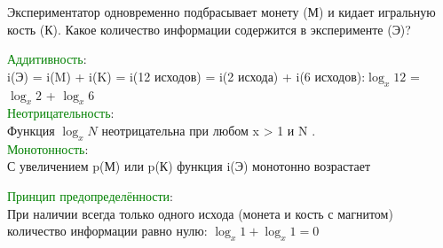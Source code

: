 \newpage
\rhead{\textbf{\textcolor{blue}{А}\textcolor{gray}{нализ свойств меры Хартли}}}
\small
{}

\vskip 1cm

Экспериментатор  одновременно  подбрасывает  монету  (М) и  кидает  игральную  кость  (К). Какое количество информации содержится в эксперименте (Э)?

\vspace{0.5cm}

\textcolor{Green}{Аддитивность}:\\
\setlength{\leftskip}{1cm}
i(Э) = i(M) + i(K) = i(12 исходов) = i(2 исхода) + i(6 исходов):$\log_x 12$ = $\log_x 2$ + $\log_x 6$\\
\setlength{\leftskip}{0cm}
\textcolor{Green}{Неотрицательность}:\\
\hspace{1cm} Функция $\log_x N$ неотрицательна при любом x > 1 и N .\\

\textcolor{Green}{Монотонность}:\\
\setlength{\leftskip}{1cm}
С увеличением p(М) или p(К) функция i(Э) монотонно возрастает\\
\setlength{\leftskip}{0cm}

\textcolor{Green}{Принцип предопределённости}:\\
\setlength{\leftskip}{1cm}
 При наличии всегда только одного исхода  (монета и кость с магнитом) количество информации
равно нулю: $\log_x 1 + \log_x 1 = 0$\\
\setlength{\leftskip}{0cm}
